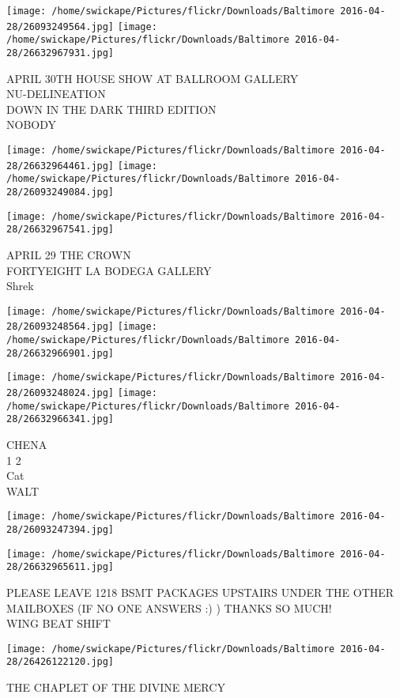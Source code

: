 \documentclass[10pt,letterpaper]{article}
\begin{document}
\texttt{[image: /home/swickape/Pictures/flickr/Downloads/Baltimore 2016-04-28/26093249564.jpg]}
\texttt{[image: /home/swickape/Pictures/flickr/Downloads/Baltimore 2016-04-28/26632967931.jpg]}

APRIL 30TH HOUSE SHOW AT BALLROOM GALLERY\\
NU{-}DELINEATION\\
DOWN IN THE DARK THIRD EDITION\\
NOBODY\\
\pagebreak

\texttt{[image: /home/swickape/Pictures/flickr/Downloads/Baltimore 2016-04-28/26632964461.jpg]}
\texttt{[image: /home/swickape/Pictures/flickr/Downloads/Baltimore 2016-04-28/26093249084.jpg]}

\vspace{0.25in}
\texttt{[image: /home/swickape/Pictures/flickr/Downloads/Baltimore 2016-04-28/26632967541.jpg]}

APRIL 29 THE CROWN\\
FORTYEIGHT LA BODEGA GALLERY\\
Shrek\\
\pagebreak

\texttt{[image: /home/swickape/Pictures/flickr/Downloads/Baltimore 2016-04-28/26093248564.jpg]}
\texttt{[image: /home/swickape/Pictures/flickr/Downloads/Baltimore 2016-04-28/26632966901.jpg]}

\texttt{[image: /home/swickape/Pictures/flickr/Downloads/Baltimore 2016-04-28/26093248024.jpg]}
\texttt{[image: /home/swickape/Pictures/flickr/Downloads/Baltimore 2016-04-28/26632966341.jpg]}

CHENA\\
1 2\\
Cat\\
WALT\\
\pagebreak

\texttt{[image: /home/swickape/Pictures/flickr/Downloads/Baltimore 2016-04-28/26093247394.jpg]}

\vspace{0.25in}
\texttt{[image: /home/swickape/Pictures/flickr/Downloads/Baltimore 2016-04-28/26632965611.jpg]}

PLEASE LEAVE 1218 BSMT PACKAGES UPSTAIRS UNDER THE OTHER MAILBOXES (IF NO ONE ANSWERS :) )  THANKS SO MUCH!\\
WING BEAT SHIFT\\
\pagebreak

\texttt{[image: /home/swickape/Pictures/flickr/Downloads/Baltimore 2016-04-28/26426122120.jpg]}

THE CHAPLET OF THE DIVINE MERCY\\
\pagebreak
\end{document}
